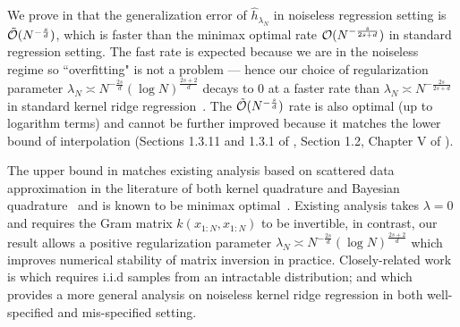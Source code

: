 \begin{rem}
    We prove in  that the generalization error of $\hat{h}_{\lambda_N}$ in noiseless regression setting is $\tilde{\mathcal{O}}(N^{-\frac{s}{d}})$, which is faster than the minimax optimal rate $\mathcal{O}(N^{-\frac{s}{2s+d}})$ in standard regression setting. The fast rate is expected because we are in the noiseless regime so ``overfitting" is not a problem --- hence our choice of regularization parameter $\lambda_N \asymp N^{-\frac{2s}{d}} (\log N)^{\frac{2s+2}{d}}$ decays to $0$ at a faster rate than $\lambda_N \asymp N^{-\frac{2s}{2s + d}}$ in standard kernel ridge regression~\citep[Corollary 5]{fischer2020sobolev}. 
    The $\tilde{\mathcal{O}}(N^{-\frac{s}{d}})$ rate is also optimal (up to logarithm terms) and cannot be further improved because it matches the lower bound of interpolation (Sections 1.3.11
    and 1.3.1 of \citet{novak2006deterministic},  Section 1.2, Chapter V of \citet{ritter2000average}). 
\end{rem}

\begin{rem} \label{rem:stage_one_error_and_standard_kq}
The upper bound in  matches existing analysis based on scattered data approximation in the literature of both kernel quadrature and Bayesian quadrature~\citep{sommariva2006numerical, Briol2019PI, wynne2021convergence} and is known to be minimax optimal~\citep{novak2016some, novak2006deterministic}. 
Existing analysis takes $\lambda = 0$ and requires the Gram matrix $ k(x_{1:N}, x_{1:N})$ to be invertible, in contrast, our result allows a positive regularization parameter $\lambda_N \asymp N^{-\frac{2s}{d}} (\log N)^{\frac{2s+2}{d}}$ which improves numerical stability of matrix inversion in practice. 
Closely-related work is \citet{Bach2015} which requires i.i.d samples from an intractable distribution; and
\citet{long2024duality} which provides a more general analysis on noiseless kernel ridge regression in both well-specified and mis-specified setting.
\end{rem}